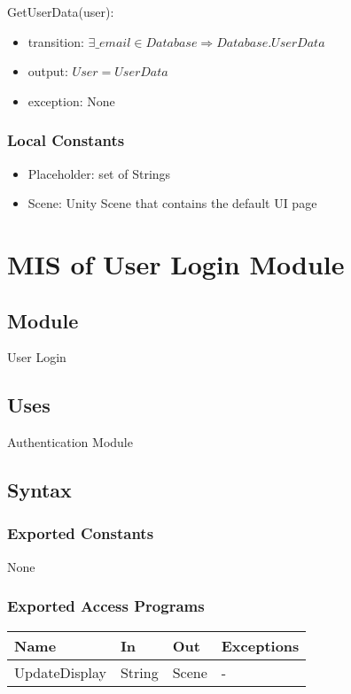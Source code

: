 \documentclass[12pt, titlepage]{article}
\begin{document}
\noindent GetUserData(user):
\begin{itemize}
\item transition: $\exists \_email \in Database \Rightarrow Database.UserData$
\item output: $User = UserData$
\item exception: None
\end{itemize}

\subsubsection{Local Constants}

\begin{itemize}
	\item Placeholder: set of Strings
	\item Scene: Unity Scene that contains the default UI page
\end{itemize}

\newpage

\section{MIS of User Login Module} \label{mLogin}

\subsection{Module}

User Login

\subsection{Uses}

Authentication Module

\subsection{Syntax}

\subsubsection{Exported Constants}

None

\subsubsection{Exported Access Programs}

\begin{center}
	\begin{tabular}{p{4cm} p{2cm} p{4cm} p{4cm}}
	\hline
	\textbf{Name} & \textbf{In} & \textbf{Out} & \textbf{Exceptions} \\
	\hline
	UpdateDisplay & String & Scene & - \\
	\hline
	\end{tabular}
\end{center}
\end{document}
